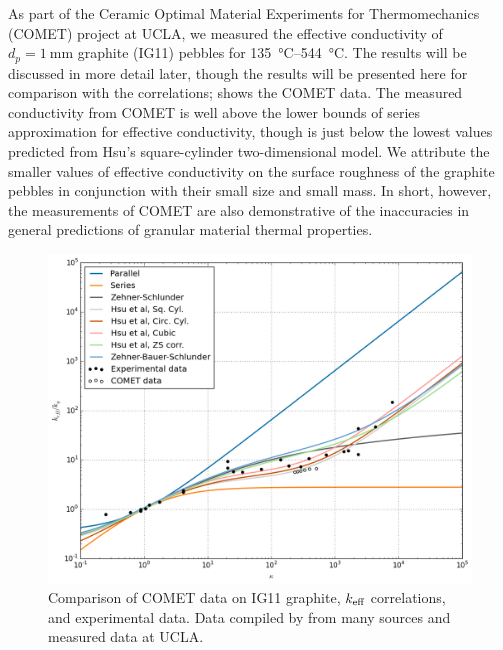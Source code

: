 As part of the Ceramic Optimal Material Experiments for Thermomechanics (COMET) project at UCLA, we measured the effective conductivity of $d_p = \SI{1}{\milli\meter}$ graphite (IG11) pebbles for \SIrange{135}{544}{\celsius}. The results will be discussed in more detail later, though the results will be presented here for comparison with the correlations;  shows the COMET data. The measured conductivity from COMET is well above the lower bounds of series approximation for effective conductivity, though is just below the lowest values predicted from Hsu\etal's square-cylinder two-dimensional model. We attribute the smaller values of effective conductivity on the surface roughness of the graphite pebbles in conjunction with their small size and small mass. In short, however, the measurements of COMET are also demonstrative of the inaccuracies in general predictions of granular material thermal properties.

\begin{figure}[ht]
    \centering
    \includegraphics[width=\textwidth]{figures/keff-kappa-experimental-comet}
    \caption{Comparison of COMET data on IG11 graphite, $k_\text{eff}$ correlations, and experimental data. Data compiled by \cite{VanAntwerpen2010} from many sources and measured data at UCLA.}
    \label{fig:kappa-experimental-comet}
\end{figure}



